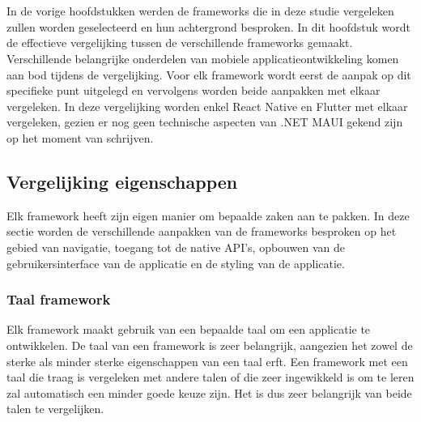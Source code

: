 
\chapter{}
\label{ch:methodologie}


In de vorige hoofdstukken werden de frameworks die in deze studie vergeleken zullen worden geselecteerd en hun achtergrond besproken. In dit hoofdstuk wordt de effectieve vergelijking tussen de verschillende frameworks gemaakt. Verschillende belangrijke onderdelen van mobiele applicatieontwikkeling komen aan bod tijdens de vergelijking. Voor elk framework wordt eerst de aanpak op dit specifieke punt uitgelegd en vervolgens worden beide aanpakken met elkaar vergeleken. In deze vergelijking worden enkel React Native en Flutter met elkaar vergeleken, gezien er nog geen technische aspecten van .NET MAUI gekend zijn op het moment van schrijven.

\section{Vergelijking eigenschappen}
\label{sec:vglEigenschappen}

Elk framework heeft zijn eigen manier om bepaalde zaken aan te pakken. In deze sectie worden de verschillende aanpakken van de frameworks besproken op het gebied van navigatie, toegang tot de native API's, opbouwen van de gebruikersinterface van de applicatie en de styling van de applicatie.

\subsection{Taal framework}
\label{subsec:taalFramework}

Elk framework maakt gebruik van een bepaalde taal om een applicatie te ontwikkelen. De taal van een framework is zeer belangrijk, aangezien het zowel de sterke als minder sterke eigenschappen van een taal erft. Een framework met een taal die traag is vergeleken met andere talen of die zeer ingewikkeld is om te leren zal automatisch een minder goede keuze zijn. Het is dus zeer belangrijk van beide talen te vergelijken.

